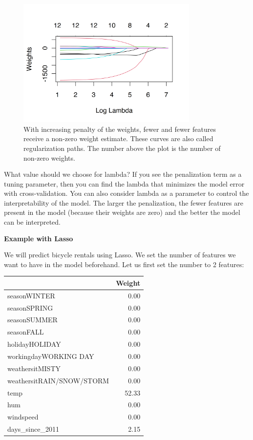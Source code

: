 \documentclass[
  11pt,
]{scrbook}
\begin{document}
\begin{figure}

{\centering \includegraphics[width=0.8\textwidth]{images/lasso-path-1} 

}

\caption{With increasing penalty of the weights, fewer and fewer features receive a non-zero weight estimate. These curves are also called regularization paths. The number above the plot is the number of non-zero weights.}\label{fig:lasso-path}
\end{figure}

What value should we choose for lambda?
If you see the penalization term as a tuning parameter, then you can find the lambda that minimizes the model error with cross-validation.
You can also consider lambda as a parameter to control the interpretability of the model.
The larger the penalization, the fewer features are present in the model (because their weights are zero) and the better the model can be interpreted.

\textbf{Example with Lasso}

We will predict bicycle rentals using Lasso.
We set the number of features we want to have in the model beforehand.
Let us first set the number to 2 features:

\begin{table}
\centering
\begin{tabular}{lr}
\toprule
  & Weight\\
\midrule
seasonWINTER & 0.00\\
seasonSPRING & 0.00\\
seasonSUMMER & 0.00\\
seasonFALL & 0.00\\
holidayHOLIDAY & 0.00\\
\addlinespace
workingdayWORKING DAY & 0.00\\
weathersitMISTY & 0.00\\
weathersitRAIN/SNOW/STORM & 0.00\\
temp & 52.33\\
hum & 0.00\\
\addlinespace
windspeed & 0.00\\
days\_since\_2011 & 2.15\\
\bottomrule
\end{tabular}
\end{table}
\end{document}
